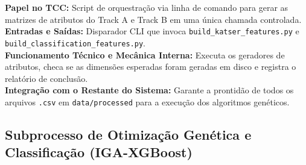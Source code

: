 \documentclass[10pt,a4paper]{article}
\begin{document}
\begin{filebox}
\textbf{Papel no TCC:} Script de orquestração via linha de comando para gerar as matrizes de atributos do Track A e Track B em uma única chamada controlada.\\
\textbf{Entradas e Saídas:} Disparador CLI que invoca \texttt{build\_katser\_features.py} e \texttt{build\_classification\_features.py}.\\
\textbf{Funcionamento Técnico e Mecânica Interna:} Executa os geradores de atributos, checa se as dimensões esperadas foram geradas em disco e registra o relatório de conclusão.\\
\textbf{Integração com o Restante do Sistema:} Garante a prontidão de todos os arquivos \texttt{.csv} em \texttt{data/processed} para a execução dos algoritmos genéticos.
\end{filebox}

\subsection{Subprocesso de Otimização Genética e Classificação (IGA-XGBoost)}
\end{document}
